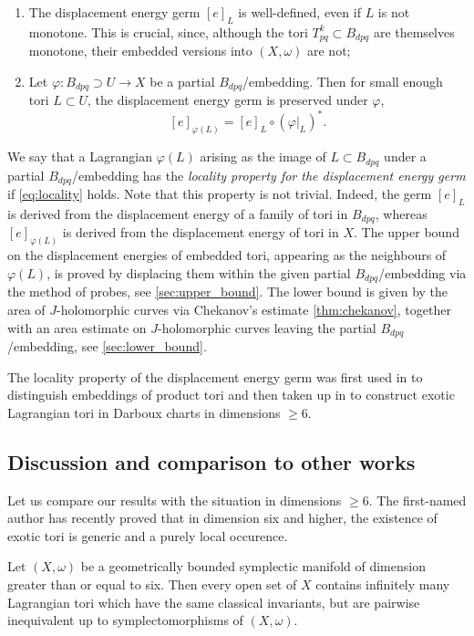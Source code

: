 \documentclass[12pt,a4paper,abstract=true,final]{scrartcl}
\begin{document}
\begin{enumerate}
    \item The displacement energy germ $[e]_L$ is well-defined, even if $L$ is not monotone.
This is crucial, since, although the tori $T^k_{pq} \subset B_{dpq}$ are themselves monotone, their embedded versions into $(X,\omega)$ are not; 
    \item Let $\varphi \colon B_{dpq} \supset U \rightarrow X$ be a partial $B_{dpq}$\-/embedding.
Then for small enough tori $L \subset U$, the displacement energy germ is preserved under $\varphi$, 
    \begin{equation}
        \label{eq:locality}
        [e]_{\varphi(L)} = [e]_L \circ (\varphi\vert_L)^*.
    \end{equation}
\end{enumerate}

We say that a Lagrangian $\varphi(L)$ arising as the image of $L \subset B_{dpq}$ under a partial $B_{dpq}$\-/embedding has the \emph{locality property for the displacement energy germ} if \eqref{eq:locality} holds. Note that this property is not trivial.
Indeed, the germ $[e]_L$ is derived from the displacement energy of a family of tori in $B_{dpq}$, whereas $[e]_{\varphi(L)}$ is derived from the displacement energy of tori in $X$. The upper bound on the displacement energies of embedded tori, appearing as the neighbours of $\varphi(L)$, is proved by displacing them within the given partial $B_{dpq}$\-/embedding via the method of probes, see \cref{sec:upper_bound}. The lower bound is given by the area of $J$-holomorphic curves via Chekanov's estimate \cref{thm:chekanov}, together with an area estimate on $J$-holomorphic curves leaving the partial $B_{dpq}$\-/embedding, see \cref{sec:lower_bound}.

The locality property of the displacement energy germ was first used in \cite{chekanovschlenk2015} to distinguish embeddings of product tori and then taken up in \cite{brendel2023local} to construct exotic Lagrangian tori in Darboux charts in dimensions $\geqslant 6$.

\subsection{Discussion and comparison to other works}
\label{sec:intro_discussion}

Let us compare our results with the situation in dimensions $\geqslant 6$.
The first-named author has recently proved that in dimension six and higher, the existence of exotic tori is generic and a purely local occurence. 
\begin{theorem}\cite[Theorem D]{brendel2023local}
    \label{thm:Bre23}
    Let $(X,\omega)$ be a geometrically bounded symplectic manifold of dimension greater than or equal to six.
    Then every open set of $X$ contains infinitely many Lagrangian tori which have the same classical invariants, but are pairwise inequivalent up to symplectomorphisms of $(X,\omega)$.
\end{theorem}
\end{document}
